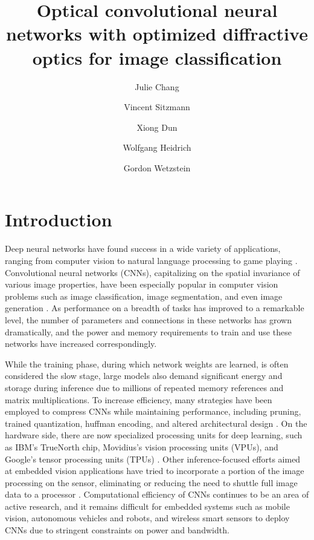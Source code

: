 \documentclass[fleqn,10pt]{wlscirep}
\title{Optical convolutional neural networks with optimized diffractive optics for image classification}
\author[1,*]{Julie Chang}
\author[2]{Vincent Sitzmann}
\author[3]{Xiong Dun}
\author[3]{Wolfgang Heidrich}
\author[2,*]{Gordon Wetzstein}
\affil[1]{Bioengineering Department, Stanford University, Stanford, CA 94305, USA}
\affil[2]{Electrical Engineering Department, Stanford University, Stanford, CA 94305, USA}
\affil[3]{Visual Computing Center, KAUST, Thuwal 23955, Saudi Arabia}
\affil[*]{\{jchang10, gordon.wetzstein\}@stanford.edu}
\begin{document}
\flushbottom
\maketitle
%
%
\thispagestyle{empty}

\section*{Introduction}
\label{sec:intro}
Deep neural networks have found success in a wide variety of applications, ranging from computer vision to natural language processing to game playing \cite{lecun2015deep}. Convolutional neural networks (CNNs), capitalizing on the spatial invariance of various image properties, have been especially popular in computer vision problems such as image classification, image segmentation, and even image generation \cite{krizhevsky2012imagenet,goodfellow2014generative,long2015fully}. As performance on a breadth of tasks has improved to a remarkable level, the number of parameters and connections in these networks has grown dramatically, and the power and memory requirements to train and use these networks have increased correspondingly. 
    
While the training phase, during which network weights are learned, is often considered the slow stage, large models also demand significant energy and storage during inference due to millions of repeated memory references and matrix multiplications. To increase efficiency, many strategies have been employed to compress CNNs while maintaining performance, including pruning, trained quantization, huffman encoding, and altered architectural design \cite{han2015deep,iandola2016squeezenet}. On the hardware side, there are now specialized processing units for deep learning, such as IBM's TrueNorth chip, Movidius's vision processing units (VPUs), and Google's tensor processing units (TPUs) \cite{jouppi2017datacenter}.  Other inference-focused efforts aimed at embedded vision applications have tried to incorporate a portion of the image processing on the sensor, eliminating or reducing the need to shuttle full image data to a processor \cite{gruev2002implementation,likamwa2016redeye}. Computational efficiency of CNNs continues to be an area of active research, and it remains difficult for embedded systems such as mobile vision, autonomous vehicles and robots, and wireless smart sensors to deploy CNNs due to stringent constraints on power and bandwidth.             
\end{document}
